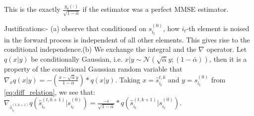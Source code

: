  This is the exactly $\frac{g_{\theta}(\cdot)}{\sqrt{1-\bar{\alpha}}}$ if the estimator was a perfect MMSE estimator.


Justifications:- (a) observe that conditioned on $s_{i_t}^{(0)}$, how $i_t$-th element is noised in the forward process is independent of all other elements. This gives rise to the conditional independence.(b) We exchange the integral and the $\nabla$ operator. Let $q(x|y)$ be conditionally Gaussian, i.e.  $x|y \sim \mathcal{N}(\sqrt{\bar{\alpha}} y ; (1-\bar{\alpha}))$, then it is a property of the conditional Gaussian random variable that $\nabla_x q(x|y) = -\left(\frac{x - \sqrt{\bar{\alpha}}y}{1-\bar{\alpha}} \right) * q(x|y)$. Taking $x = \hat{s}_{i_t}^{t,k}$ and $y = s_{i_t}^{(0)}$ from \eqref{eq:diff_relation}, we see that: $\nabla_{\hat{s}_{i_t}^{(t, k+1)}}  q(\hat{s}_{i_t}^{(t, k+1)}| s_{i_t}^{(0)} ) = \frac{-\epsilon}{\sqrt{1-\bar{\alpha}}}* q(\hat{s}_{i_t}^{(t, k+1)}| s_{i_t}^{(0)} ) $.

\newpage
